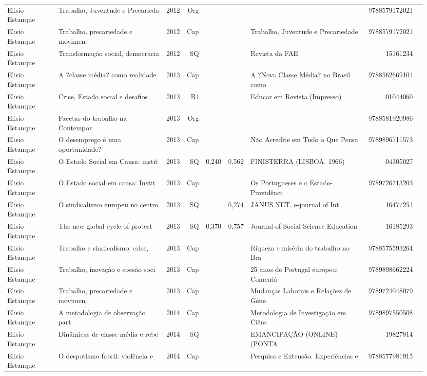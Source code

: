 \documentclass[12pt,brazil]{article}\usepackage[]{graphicx}\usepackage[]{xcolor}
\begin{document}
\begin{longtable}{lllrrllrr}
Elisio Estanque & Trabalho, Juventude e Precarieda & 2012 & Org &  &  &  & 9788579172021 \\
Elisio Estanque & Trabalho, precariedade e movimen & 2012 & Cap &  &  & Trabalho, Juventude e Precariedade & 9788579172021 \\
Elisio Estanque & Transformação social, democracia & 2012 & SQ &  &  & Revista da FAE & 15161234 \\
Elisio Estanque & A ?classe média? como realidade  & 2013 & Cap &  &  & A ?Nova Classe Média? no Brasil como & 9788562669101 \\
Elisio Estanque & Crise, Estado social e desafios  & 2013 & B1 &  &  & Educar em Revista (Impresso) & 01044060 \\
Elisio Estanque & Facetas do trabalho na Contempor & 2013 & Org &  &  &  & 9788581920986 \\
Elisio Estanque & O desemprego é uma oportunidade? & 2013 & Cap &  &  & Não Acredite em Tudo o Que Pensa & 9789896711573 \\
Elisio Estanque & O Estado Social em Causa: instit & 2013 & SQ & 0,240 & 0,562 & FINISTERRA (LISBOA. 1966) & 04305027 \\
\rowcolor{duplic}Elisio Estanque & O Estado social em causa: Instit & 2013 & Cap &  &  & Os Portugueses e o Estado-Providênci & 9789726713203 \\
Elisio Estanque & O sindicalismo europeu no centro & 2013 & SQ &  & 0,274 & JANUS.NET, e-journal of Int & 16477251 \\
Elisio Estanque & The new global cycle of protest  & 2013 & SQ & 0,370 & 0,757 & Journal of Social Science Education & 16185293 \\
Elisio Estanque & Trabalho e sindicalismo: crise,  & 2013 & Cap &  &  & Riqueza e miséria do trabalho no Bra & 9788575593264 \\
Elisio Estanque & Trabalho, inovação e coesão soci & 2013 & Cap &  &  & 25 anos de Portugal europeu: Comentá & 9789898662224 \\
\rowcolor{duplic}Elisio Estanque & Trabalho, precariedade e movimen & 2013 & Cap &  &  & Mudanças Laborais e Relações de Géne & 9789724048079 \\
Elisio Estanque & A metodologia de observação part & 2014 & Cap &  &  & Metodologia de Investigação em Ciênc & 9789897550508 \\
Elisio Estanque & Dinâmicas de classe média e rebe & 2014 & SQ &  &  & EMANCIPAÇÃO (ONLINE) (PONTA & 19827814 \\
Elisio Estanque & O despotismo fabril: violência e & 2014 & Cap &  &  & Pesquisa e Extensão. Experiências e  & 9788577981915 \\

\end{longtable}
\end{document}
